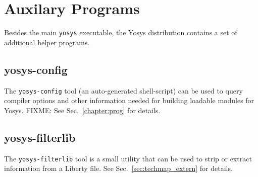 
\chapter{Auxilary Programs}

Besides the main {\tt yosys} executable, the Yosys distribution contains a set
of additional helper programs.

\section{yosys-config}

The {\tt yosys-config} tool (an auto-generated shell-script) can be used to
query compiler options and other information needed for building loadable
modules for Yosys. FIXME: See Sec.~\ref{chapter:prog} for details.

\section{yosys-filterlib}
\label{sec:filterlib}

The {\tt yosys-filterlib} tool is a small utility that can be used to strip
or extract information from a Liberty file. See Sec.~\ref{sec:techmap_extern}
for details.


